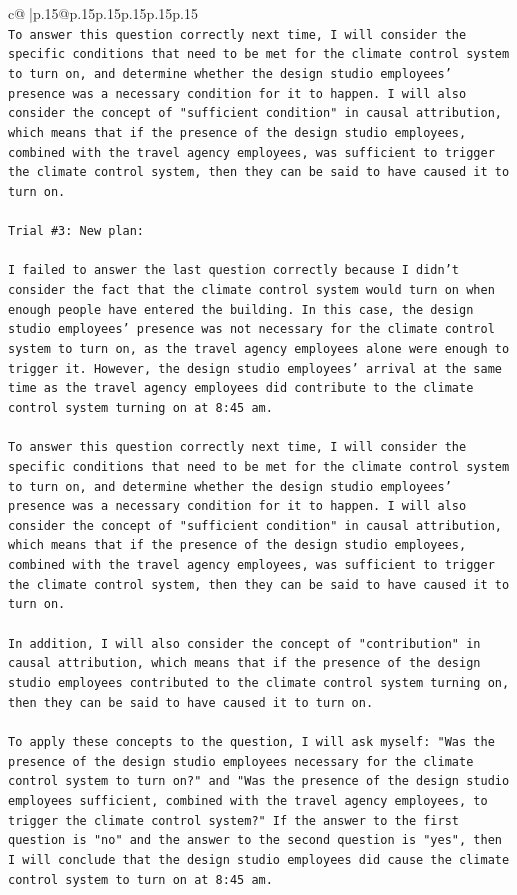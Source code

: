 \documentclass{article}
\begin{document}
{\begin{supertabular}{c@{$\;$}|p{.15\linewidth}@{}p{.15\linewidth}p{.15\linewidth}p{.15\linewidth}p{.15\linewidth}p{.15\linewidth}}
{{{\\ 
\texttt{To answer this question correctly next time, I will consider the specific conditions that need to be met for the climate control system to turn on, and determine whether the design studio employees' presence was a necessary condition for it to happen. I will also consider the concept of "sufficient condition" in causal attribution, which means that if the presence of the design studio employees, combined with the travel agency employees, was sufficient to trigger the climate control system, then they can be said to have caused it to turn on.} \\
\\ 
\texttt{Trial \#3: New plan: } \\
\\ 
\texttt{I failed to answer the last question correctly because I didn't consider the fact that the climate control system would turn on when enough people have entered the building. In this case, the design studio employees' presence was not necessary for the climate control system to turn on, as the travel agency employees alone were enough to trigger it. However, the design studio employees' arrival at the same time as the travel agency employees did contribute to the climate control system turning on at 8:45 am. } \\
\\ 
\texttt{To answer this question correctly next time, I will consider the specific conditions that need to be met for the climate control system to turn on, and determine whether the design studio employees' presence was a necessary condition for it to happen. I will also consider the concept of "sufficient condition" in causal attribution, which means that if the presence of the design studio employees, combined with the travel agency employees, was sufficient to trigger the climate control system, then they can be said to have caused it to turn on. } \\
\\ 
\texttt{In addition, I will also consider the concept of "contribution" in causal attribution, which means that if the presence of the design studio employees contributed to the climate control system turning on, then they can be said to have caused it to turn on. } \\
\\ 
\texttt{To apply these concepts to the question, I will ask myself: "Was the presence of the design studio employees necessary for the climate control system to turn on?" and "Was the presence of the design studio employees sufficient, combined with the travel agency employees, to trigger the climate control system?" If the answer to the first question is "no" and the answer to the second question is "yes", then I will conclude that the design studio employees did cause the climate control system to turn on at 8:45 am.} \\
}}}
\end{supertabular}}
\end{document}
